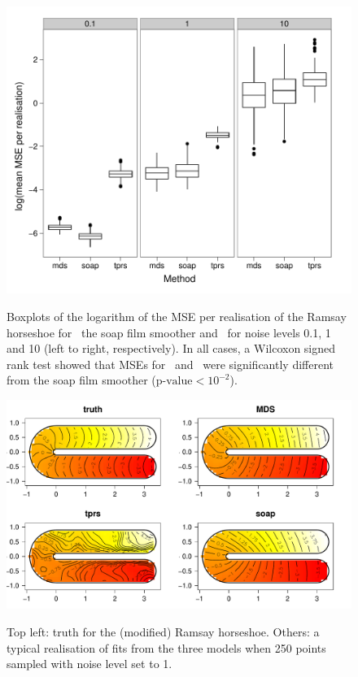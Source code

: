 \begin{figure}
\centering
\includegraphics[width=6in]{mds/figs/mds-ramsay-boxplot.pdf} \\
\caption{Boxplots of the logarithm of the MSE per realisation of the Ramsay horseshoe for \mdsap\, the soap film smoother and \tprs\ for noise levels 0.1, 1 and 10 (left to right, respectively). In all cases, a Wilcoxon signed rank test showed that MSEs for \mdsap\ and \tprs\ were significantly different from the soap film smoother ($\text{p-value} < 10^{-2}$).}
\label{mds-ramsay-boxplot}
\end{figure}

\begin{figure}
\centering
\includegraphics[width=6in]{mds/figs/ramsay-fit-1.pdf} \\
\caption{Top left: truth for the (modified) Ramsay horseshoe. Others: a typical realisation of fits from the three models when 250 points sampled with noise level set to 1.}
\label{mds-ramsay-fit-1}
\end{figure}

